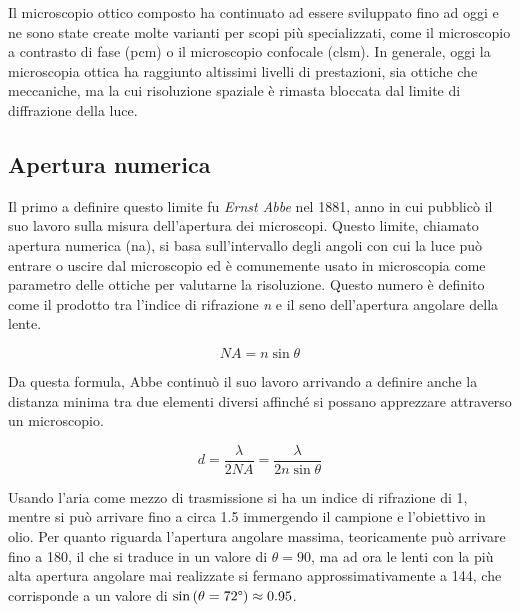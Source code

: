 \documentclass[../main.tex]{subfiles}
\begin{document}
Il microscopio ottico composto ha continuato ad essere sviluppato fino ad oggi e ne sono state create molte varianti per scopi più specializzati, come il microscopio a contrasto di fase (\acrshort{pcm})\cite{zernike_1955} o il microscopio confocale (\acrshort{clsm})\cite{pawley_2006}. In generale, oggi la microscopia ottica ha raggiunto altissimi livelli di prestazioni, sia ottiche che meccaniche, ma la cui risoluzione spaziale è rimasta bloccata dal limite di diffrazione della luce.

\subsection{Apertura numerica} \label{s:na}

Il primo a definire questo limite fu \textit{Ernst Abbe} nel 1881, anno in cui pubblicò il suo lavoro sulla misura dell'apertura dei microscopi.\cite{abbe_1881} Questo limite, chiamato apertura numerica (\acrshort{na}), si basa sull'intervallo degli angoli con cui la luce può entrare o uscire dal microscopio  ed è comunemente usato in microscopia come parametro delle ottiche per valutarne la risoluzione. Questo numero è definito come il prodotto tra l'indice di rifrazione \textit{n} e il seno dell'apertura angolare della lente.

\begin{equation}
	\mathit{NA}=n\sin\theta
\end{equation}

Da questa formula, Abbe continuò il suo lavoro arrivando a definire anche la distanza minima tra due elementi diversi affinché si possano apprezzare attraverso un microscopio.\cite{abbe_1882}

\begin{equation}
d=\frac{\lambda}{2\mathit{NA}}=\frac{\lambda}{2n\sin\theta}
\end{equation}

Usando l'aria come mezzo di trasmissione si ha un indice di rifrazione di 1, mentre si può arrivare fino a circa 1.5 immergendo il campione e l'obiettivo in olio. Per quanto riguarda l'apertura angolare massima,  teoricamente può arrivare fino a 180\degree, il che si traduce in un valore di $\theta=90$\degree, ma ad ora le lenti con la più alta apertura angolare mai realizzate si fermano approssimativamente a 144\degree, che corrisponde a un valore di $\sin\left(\theta=72\degree\right) \approx 0.95$.\cite{leica_aperture}\\
\end{document}

